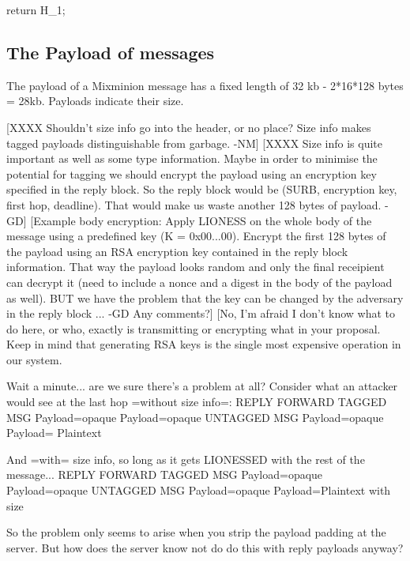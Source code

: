 return H_1;

\subsection{The Payload of messages}

The payload of a Mixminion message has a fixed length of 32 kb
- 2*16*128 bytes = 28kb.   Payloads indicate their size.

  [XXXX Shouldn't size info go into the header, or no place?  Size
     info makes tagged payloads distinguishable from garbage. -NM]
  [XXXX Size info is quite important as well as some type information.
     Maybe in order to minimise the potential for tagging we should
     encrypt the payload using an encryption key specified in the
     reply block. So the reply block would be (SURB, encryption key,
     first hop, deadline). That would make us waste another 128 bytes
     of payload. -GD]
  [Example body encryption: Apply LIONESS on the whole body of the
     message using a predefined key (K = 0x00...00). Encrypt the first
     128 bytes of the payload using an RSA encryption key contained in
     the reply block information. That way the payload looks random
     and only the final receipient can decrypt it (need to include a
     nonce and a digest in the body of the payload as well). BUT we
     have the problem that the key can be changed by the adversary in
     the reply block ... -GD Any comments?]
  [No, I'm afraid I don't know what to do here, or who, exactly is
     transmitting or encrypting what in your proposal.  Keep in mind 
     that generating RSA keys is the single most expensive operation
     in our system.
 
     Wait a minute... are we sure there's a problem at all?  Consider
     what an attacker would see at the last hop =without size info=:
                            REPLY          FORWARD 
          TAGGED MSG     Payload=opaque  Payload=opaque 
          UNTAGGED MSG   Payload=opaque  Payload= Plaintext 

     And =with= size info, so long as it gets LIONESSED with the
     rest of the message...
                            REPLY          FORWARD 
          TAGGED MSG     Payload=opaque  Payload=opaque 
          UNTAGGED MSG   Payload=opaque  Payload=Plaintext with size

     So the problem only seems to arise when you strip the payload
     padding at the server.  But how does the server know not do
     do this with reply payloads anyway?


